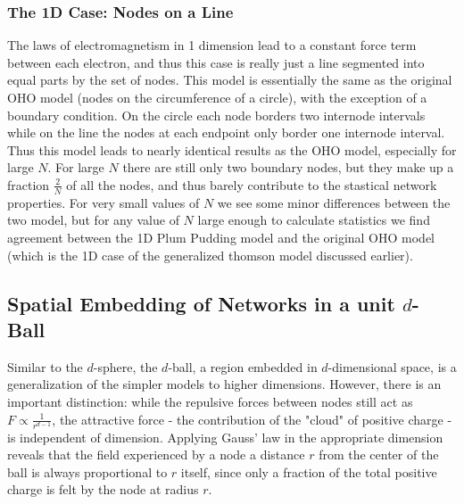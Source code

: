 \documentclass[aps,pre,reprint,superscriptaddress,amsmath,amssymb,nofootinbib]{revtex4-1}
\begin{document}
\subsubsection{The 1D Case: Nodes on a Line}
The laws of electromagnetism in 1 dimension lead to a constant force term between each electron, and thus this case is really just a line segmented into equal parts by the set of nodes. 
This model is essentially the same as the original OHO model (nodes on the circumference of a circle), with the exception of a boundary condition. 
On the circle each node borders two internode intervals while on the line the nodes at each endpoint only border one internode interval.
Thus this model leads to nearly identical results as the OHO model, especially for large $N$.
For large $N$ there are still only two boundary nodes, but they make up a fraction $\frac{2}{N}$ of all the nodes, and thus barely contribute to the stastical network properties.
For very small values of $N$ we see some minor differences between the two model, but for any value of $N$ large enough to calculate statistics we find agreement between the 1D Plum Pudding model and the original OHO model (which is the 1D case of the generalized thomson model discussed earlier).

\subsection{Spatial Embedding of Networks in a unit $d$-Ball}
Similar to the $d$-sphere, the $d$-ball, a region embedded in $d$-dimensional space, is a generalization of the simpler models to higher dimensions.  
However, there is an important distinction: while the repulsive forces between nodes still act as $F \propto \frac{1}{r^{d-1}}$, the attractive force - the contribution of the "cloud" of positive charge - is independent of dimension.  
Applying Gauss' law in the appropriate dimension reveals that the field experienced by a node a distance $r$ from the center of the ball is always proportional to $r$ itself, since only a fraction of the total positive charge is felt by the node at radius $r$.
\end{document}
